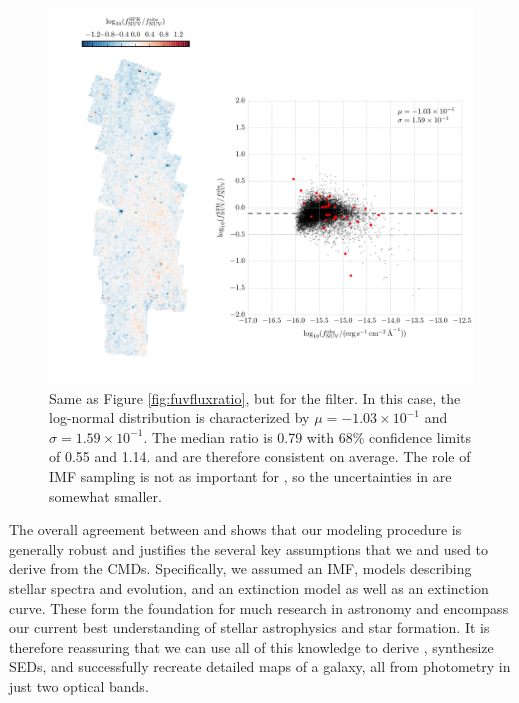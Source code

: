 \documentclass[iop, tighten]{emulateapj}
\begin{document}
\begin{figure}
\centering
\includegraphics[width=\textwidth]{m31flux-figures/flux_nuv_sfh-vs-obs.pdf}
\caption[Ratio of the synthetic flux to the observed flux in the \nuv{}
filter.]{Same as Figure \ref{fig:fuvfluxratio}, but for the \nuv{} filter.
    In this case, the log-normal distribution is characterized by $\mu =
    -1.03\times 10^{-1}$ and $\sigma = 1.59\times 10^{-1}$. The median ratio is
    0.79 with 68\% confidence limits of 0.55 and 1.14. \fnuvsfh{} and
    \fnuvobs{} are therefore consistent on average. The role of IMF sampling is
    not as important for \fnuvobs{}, so the uncertainties in \fnuvsfh{} are
    somewhat smaller.
}
\label{fig:nuvfluxratio}
\end{figure}


The overall agreement between \fxsfh{} and \fxobs{} shows that our modeling
procedure is generally robust and justifies the several key assumptions that we
and \citet{Lewis:2014} used to derive \fxsfh{} from the CMDs. Specifically, we
assumed an IMF, models describing stellar spectra and evolution, and an
extinction model as well as an extinction curve. These form the foundation for
much research in astronomy and encompass our current best understanding of
stellar astrophysics and star formation. It is therefore reassuring that we can
use all of this knowledge to derive , synthesize SEDs, and successfully
recreate detailed maps of a galaxy, all from photometry in just two optical
bands.
\end{document}
